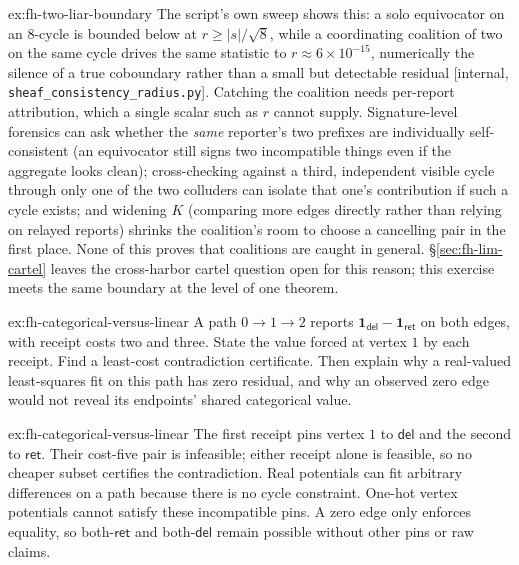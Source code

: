 \documentclass[11pt,a4paper]{article}
\theoremstyle{definition}
\theoremstyle{remark}
\begin{document}
\begin{pdsolution}{ex:fh-two-liar-boundary}
The script's own sweep shows this: a solo equivocator on an 8-cycle is bounded below at $r\ge|s|/\sqrt8$, while a coordinating coalition of two on the same cycle drives the same statistic to $r\approx6\times10^{-15}$, numerically the silence of a true coboundary rather than a small but detectable residual [internal, \texttt{sheaf\_consistency\_radius.py}]. Catching the coalition needs per-report attribution, which a single scalar such as $r$ cannot supply. Signature-level forensics can ask whether the \emph{same} reporter's two prefixes are individually self-consistent (an equivocator still signs two incompatible things even if the aggregate looks clean); cross-checking against a third, independent visible cycle through only one of the two colluders can isolate that one's contribution if such a cycle exists; and widening $K$ (comparing more edges directly rather than relying on relayed reports) shrinks the coalition's room to choose a cancelling pair in the first place. None of this proves that coalitions are caught in general. \S\ref{sec:fh-lim-cartel} leaves the cross-harbor cartel question open for this reason; this exercise meets the same boundary at the level of one theorem.
\end{pdsolution}

\begin{pdexercise}[kind=Trace,rating=2]{ex:fh-categorical-versus-linear}
A path $0\to1\to2$ reports $\mathbf{1}_{\mathsf{del}}-\mathbf{1}_{\mathsf{ret}}$ on both edges, with receipt costs two
and three. State the value forced at vertex $1$ by each receipt. Find a
least-cost contradiction certificate. Then explain why a real-valued
least-squares fit on this path has zero residual, and why an observed zero
edge would not reveal its endpoints' shared categorical value.
\end{pdexercise}
\begin{pdsolution}{ex:fh-categorical-versus-linear}
The first receipt pins vertex $1$ to $\mathsf{del}$ and the second to $\mathsf{ret}$. Their cost-five
pair is infeasible; either receipt alone is feasible, so no cheaper subset
certifies the contradiction. Real potentials can fit arbitrary differences
on a path because there is no cycle constraint. One-hot vertex potentials
cannot satisfy these incompatible pins. A zero edge only enforces equality,
so both-$\mathsf{ret}$ and both-$\mathsf{del}$ remain possible without other pins or raw claims.
\end{pdsolution}

\end{document}
